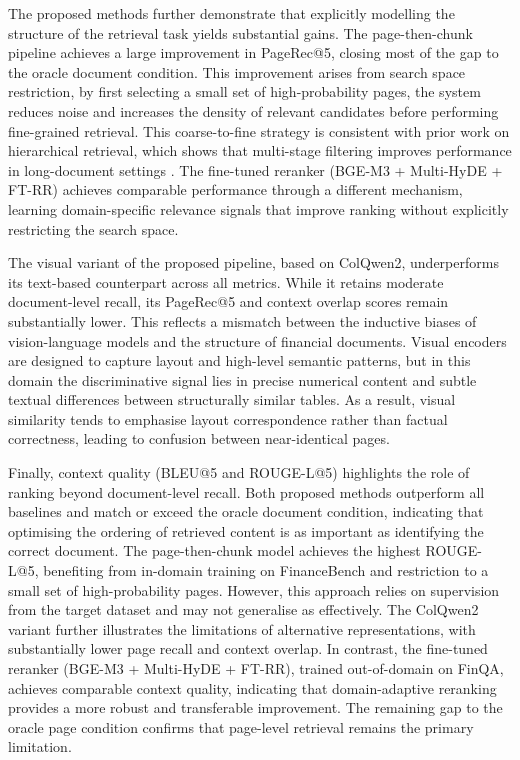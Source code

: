 \documentclass[12pt,twoside,maitrise]{dms}
\theoremstyle{definition}
\numberwithin{equation}{section}
\numberwithin{table}{chapter}
\numberwithin{figure}{chapter}
\begin{document}
The proposed methods further demonstrate that explicitly modelling the structure of the retrieval task yields substantial gains. The page-then-chunk pipeline achieves a large improvement in PageRec@5, closing most of the gap to the oracle document condition. This improvement arises from search space restriction, by first selecting a small set of high-probability pages, the system reduces noise and increases the density of relevant candidates before performing fine-grained retrieval. This coarse-to-fine strategy is consistent with prior work on hierarchical retrieval, which shows that multi-stage filtering improves performance in long-document settings \citep{gao2023retrieval}. The fine-tuned reranker (BGE-M3 + Multi-HyDE + FT-RR) achieves comparable performance through a different mechanism, learning domain-specific relevance signals that improve ranking without explicitly restricting the search space.

The visual variant of the proposed pipeline, based on ColQwen2, underperforms its
text-based counterpart across all metrics. While it retains moderate document-level recall, its PageRec@5 and context overlap scores remain substantially lower. This reflects a mismatch between the inductive biases of vision-language models and the structure of financial documents. Visual encoders are designed to capture layout and high-level semantic patterns, but in this domain the discriminative signal lies in precise numerical content and subtle textual differences between structurally similar tables. As a result, visual similarity tends to emphasise layout correspondence rather than factual correctness, leading to confusion between near-identical pages.

Finally, context quality (BLEU@5 and ROUGE-L@5) highlights the role of ranking beyond
document-level recall. Both proposed methods outperform all baselines and match or exceed
the oracle document condition, indicating that optimising the ordering of retrieved content
is as important as identifying the correct document. The page-then-chunk model achieves the highest ROUGE-L@5, benefiting from in-domain
training on FinanceBench and restriction to a small set of high-probability pages.
However, this approach relies on supervision from the target dataset and may not generalise
as effectively. The ColQwen2 variant further illustrates the limitations of alternative
representations, with substantially lower page recall and context overlap. In contrast,
the fine-tuned reranker (BGE-M3 + Multi-HyDE + FT-RR), trained out-of-domain on FinQA,
achieves comparable context quality, indicating that domain-adaptive reranking provides
a more robust and transferable improvement. The remaining gap to the oracle page condition
confirms that page-level retrieval remains the primary limitation.
\end{document}
